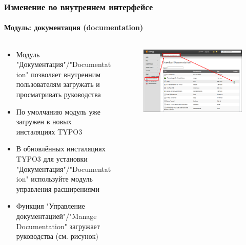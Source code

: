 \begin{frame}[fragile]
	\frametitle{Изменение во внутреннем интерфейсе}
	\framesubtitle{Модуль: документация (documentation)}

	\begin{columns}[T]

		\begin{column}{.5\textwidth}
			\begin{itemize}
				\item Модуль "Документация"/"Documentation" позволяет внутренним пользователям загружать и просматривать
				руководства
				\item По умолчанию модуль уже загружен в новых инсталяциях TYPO3
				\item В обновлённых инсталяциях TYPO3 для установки "Документация"/"Documentation" используйте модуль
				управления расширениями
				\item Функция "Управление документацией"/"Manage Documentation" загружает руководства (см. рисунок)
			\end{itemize}
		\end{column}

		\begin{column}{.5\textwidth}
			\begin{figure}\vspace*{-0.4cm}
				\includegraphics[width=1\linewidth]{Images/BackendChanges/DownloadDocumentation.png}
			\end{figure}
		\end{column}

	\end{columns}

\end{frame}

